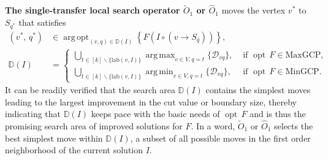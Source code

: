 \documentclass[12pt, a4paper]{article}%
\DeclareMathOperator*{\argmin}{\ensuremath{arg\,min}}
\DeclareMathOperator*{\argmax}{\ensuremath{arg\,max}}
\DeclareMathOperator*{\argopt}{\ensuremath{arg\,opt}}
\DeclareMathOperator*{\opt}{\ensuremath{opt}}
\newcommand{\labeling}{\ensuremath{\mathrm{lab}}}
\numberwithin{equation}{section}
\theoremstyle{plain}
\newcommand{\blue}{\textcolor{blue}}
\begin{document}
			\textbf{The single-transfer local search operator $\widetilde{O}_1$ or $\widehat{O}_1$}  moves the vertex ${v}^*$ to $S_{{q}^*}$ that satisfies
			\begin{align}
				\label{choice::o1cut}
				({v}^*,\,{q}^*)
				&\in 
				\argopt_{(v,q)\in \mathbb{D}(I)}\left\{F(I\circ (v\rightarrow S_q))\right\},
				\\
				\label{eq::d_vq}
				\mathbb{D}(I)
				&=\left\{
				\begin{aligned}
					\bigcup\limits_{t\in [k]\backslash\{\labeling(v, I)\}}\argmax_{v\in V,q=t}\{\mathcal{D}_{vq}\}, & \text{~if~}\opt\, F\in\text{MaxGCP},\\
					\bigcup\limits_{t\in [k]\backslash\{\labeling(v, I)\}}\argmin_{v\in V,q=t}\{\mathcal{D}_{vq}\},  & \text{~if~}\opt\, F\in\text{MinGCP}.
				\end{aligned}
				\right.
			\end{align}
			It can be readily verified that the search area $\mathbb{D}(I)$ contains the simplest moves leading to the largest improvement in the cut value or boundary size, thereby indicating that $\mathbb{D}(I)$ keeps pace with the basic needs of $\opt\,F$ and is thus the promising search area of improved solutions for $F$. In a word, $\widetilde{O}_1$ or $\widehat{O}_1$ selects the best simplest move within $\mathbb{D}(I)$, a subset of all possible moves in the first order neighborhood of the current solution $I$.
			
			
			
			
			
			
\end{document}
